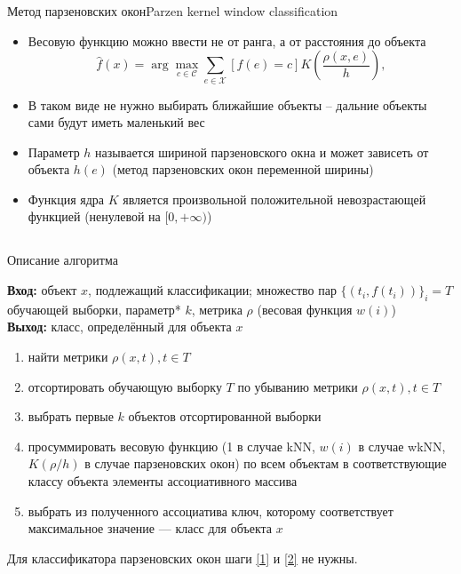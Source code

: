 \documentclass[red,unicode]{beamer}
\begin{document}
\begin{frame}{Метод парзеновских окон}{Parzen kernel window classification}
\begin{itemize}
	\item Весовую функцию можно ввести не от ранга, а от расстояния до объекта
	$$
	\hat f(x) = \arg \max_{c\in\mathcal{C}} \sum_{e \in \mathcal{X}} [f(e) = c] K\left(\frac{\rho (x,e)}{h}\right),
	$$
	\item В таком виде не нужно выбирать ближайшие объекты -- дальние объекты сами будут иметь маленький вес
	\item Параметр $h$ называется шириной парзеновского окна и может зависеть от объекта $h(e)$ (метод парзеновских окон переменной ширины)
	\item Функция ядра $K$ является произвольной положительной невозрастающей функцией (ненулевой на $[0,+\infty)$)
\end{itemize}
\end{frame}

\subsection{}

\begin{frame}{Описание алгоритма}
\begin{block}{}
\small
{\bf\color{main}Вход:} объект $x$, подлежащий классификации; множество пар $\{(t_i,f(t_i))\}_i = T$ обучающей выборки, параметр* $k$, метрика $\rho$ (весовая функция $w(i)$)\\
{\bf\color{main}Выход:} класс, определённый для объекта $x$
	\begin{enumerate}
		\item найти метрики $\rho(x,t), t \in T$
		\item \label{1} отсортировать обучающую выборку $T$ по убыванию метрики $\rho(x,t), t\in T$ 
		\item \label{2} выбрать первые $k$ объектов отсортированной выборки
		\item просуммировать весовую функцию (1 в случае kNN, $w(i)$ в случае wkNN, $K(\rho/h)$ в случае парзеновских окон) по всем объектам в соответствующие классу объекта элементы ассоциативного массива
		\item выбрать из полученного ассоциатива ключ, которому соответствует максимальное значение --- класс для объекта $x$ 
	\end{enumerate}
	{Для классификатора парзеновских окон шаги \ref{1} и \ref{2} не нужны.}
\end{block}

\end{frame}
\end{document}
